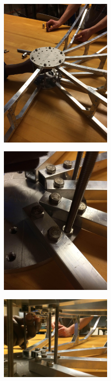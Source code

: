 \documentclass[11pt]{article} %
\begin{document}
\begin{figure}
  \centering
  \caption{   }
  \includegraphics[width=0.50\textwidth]{dish/01.jpeg}
\end{figure}

\begin{figure}
  \centering
  \caption{   }
  \includegraphics[width=0.50\textwidth]{dish/02.jpeg}
\end{figure}

\begin{figure}
  \centering
  \caption{   }
  \includegraphics[width=0.50\textwidth]{dish/03.jpeg}
\end{figure}
\end{document}
